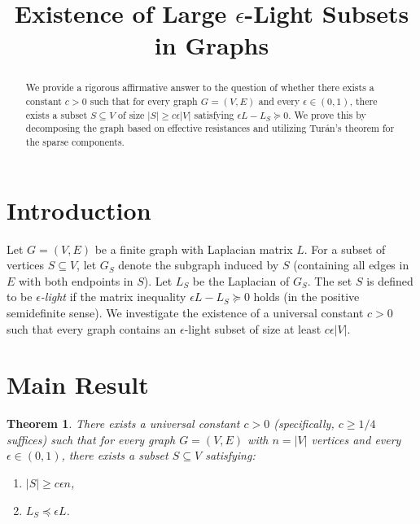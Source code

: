 \documentclass{article}
\title{Existence of Large $\epsilon$-Light Subsets in Graphs}
\author{}
\date{}
\newtheorem{theorem}{Theorem}
\begin{document}
\maketitle

\begin{abstract}
We provide a rigorous affirmative answer to the question of whether there exists a constant $c > 0$ such that for every graph $G=(V,E)$ and every $\epsilon \in (0,1)$, there exists a subset $S \subseteq V$ of size $|S| \geq c \epsilon |V|$ satisfying $\epsilon L - L_S \succeq 0$. We prove this by decomposing the graph based on effective resistances and utilizing Tur\'an's theorem for the sparse components.
\end{abstract}

\section{Introduction}

Let $G = (V, E)$ be a finite graph with Laplacian matrix $L$. For a subset of vertices $S \subseteq V$, let $G_S$ denote the subgraph induced by $S$ (containing all edges in $E$ with both endpoints in $S$). Let $L_S$ be the Laplacian of $G_S$. The set $S$ is defined to be \emph{$\epsilon$-light} if the matrix inequality $\epsilon L - L_S \succeq 0$ holds (in the positive semidefinite sense). We investigate the existence of a universal constant $c > 0$ such that every graph contains an $\epsilon$-light subset of size at least $c \epsilon |V|$.

\section{Main Result}

\begin{theorem}
There exists a universal constant $c > 0$ (specifically, $c \ge 1/4$ suffices) such that for every graph $G = (V, E)$ with $n = |V|$ vertices and every $\epsilon \in (0, 1)$, there exists a subset $S \subseteq V$ satisfying:
\begin{enumerate}
    \item $|S| \geq c \epsilon n$,
    \item $L_S \preceq \epsilon L$.
\end{enumerate}
\end{theorem}
\end{document}
